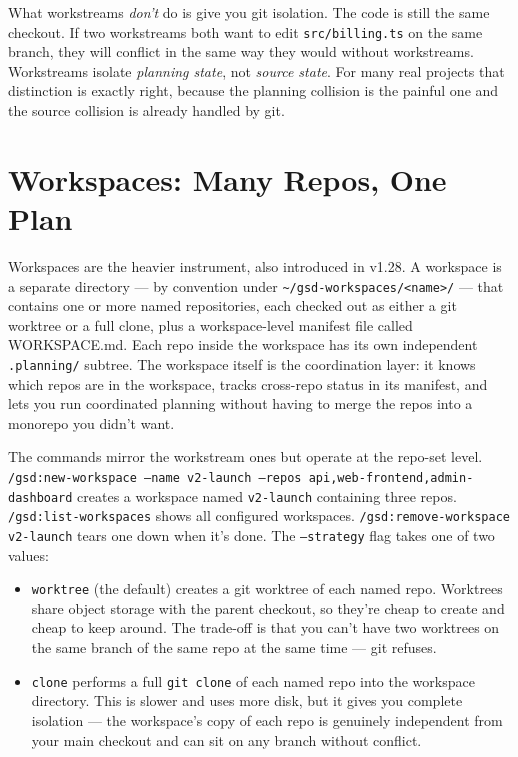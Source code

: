 \documentclass[11pt,letterpaper,openany]{book}
\begin{document}
What workstreams \emph{don't} do is give you git isolation. The code
is still the same checkout. If two workstreams both want to edit
\texttt{src/billing.ts} on the same branch, they will conflict in the
same way they would without workstreams. Workstreams isolate
\emph{planning state}, not \emph{source state}. For many real projects
that distinction is exactly right, because the planning collision is
the painful one and the source collision is already handled by git.

\section{Workspaces: Many Repos, One Plan}

Workspaces are the heavier instrument, also introduced in v1.28. A
workspace is a separate directory --- by convention under
\texttt{\~{}/gsd-workspaces/<name>/} --- that contains one or more
named repositories, each checked out as either a git worktree or a
full clone, plus a workspace-level manifest file called WORKSPACE.md.
Each repo inside the workspace has its own independent
\texttt{.planning/} subtree. The workspace itself is the coordination
layer: it knows which repos are in the workspace, tracks cross-repo
status in its manifest, and lets you run coordinated planning without
having to merge the repos into a monorepo you didn't want.

The commands mirror the workstream ones but operate at the repo-set
level. \texttt{/gsd:new-workspace --name v2-launch --repos api,web-frontend,admin-dashboard}
creates a workspace named \texttt{v2-launch} containing three repos.
\texttt{/gsd:list-workspaces} shows all configured workspaces.
\texttt{/gsd:remove-workspace v2-launch} tears one down when it's done.
The \texttt{--strategy} flag takes one of two values:

\begin{itemize}
\item \texttt{worktree} (the default) creates a git worktree of each
  named repo. Worktrees share object storage with the parent
  checkout, so they're cheap to create and cheap to keep around.
  The trade-off is that you can't have two worktrees on the same
  branch of the same repo at the same time --- git refuses.
\item \texttt{clone} performs a full \texttt{git clone} of each
  named repo into the workspace directory. This is slower and uses
  more disk, but it gives you complete isolation --- the workspace's
  copy of each repo is genuinely independent from your main checkout
  and can sit on any branch without conflict.
\end{itemize}
\end{document}
